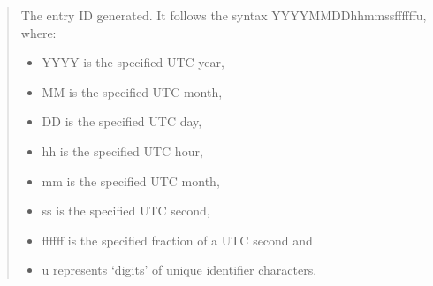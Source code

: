 \documentclass[letterpaper,10pt,english]{sphinxmanual}
\begin{document}
\begin{fulllineitems}
\begin{description}
\end{description}
\begin{quote}\begin{description}
\sphinxAtStartPar

\sphinxAtStartPar
The entry ID generated. It follows the syntax YYYYMMDDhhmmssffffff\sphinxhyphen{}u,
where:
\begin{itemize}
\item {} 
\sphinxAtStartPar
YYYY   is the specified UTC year,

\item {} 
\sphinxAtStartPar
MM     is the specified UTC month,

\item {} 
\sphinxAtStartPar
DD     is the specified UTC day,

\item {} 
\sphinxAtStartPar
hh     is the specified UTC hour,

\item {} 
\sphinxAtStartPar
mm     is the specified UTC month,

\item {} 
\sphinxAtStartPar
ss     is the specified UTC second,

\item {} 
\sphinxAtStartPar
ffffff is the specified fraction of a UTC second and

\item {} 
\sphinxAtStartPar
u      represents ‘digits’ of unique identifier characters.

\end{itemize}


\sphinxAtStartPar
{}

\end{description}\end{quote}

\end{fulllineitems}

\end{document}
